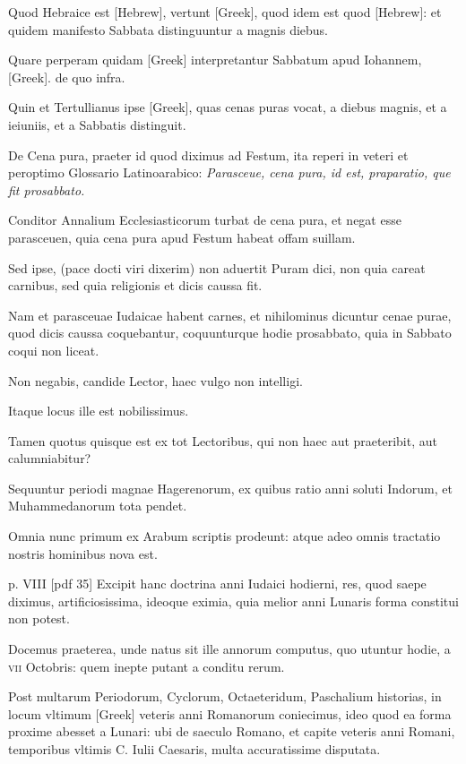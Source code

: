 \begin{parnumbers}
Quod Hebraice est \texthebrew{[Hebrew]}, vertunt \textgreek{[Greek]}, quod idem
est quod \texthebrew{[Hebrew]}: et quidem manifesto Sabbata distinguuntur a
magnis diebus. 

Quare perperam quidam \textgreek{[Greek]} interpretantur
Sabbatum apud Iohannem, \textgreek{[Greek]}. de quo infra.

Quin et Tertullianus ipse \textgreek{[Greek]},
quas cenas puras vocat, a diebus magnis, et a ieiuniis, et a
Sabbatis distinguit.

De Cena pura, praeter id quod diximus ad
Festum, ita reperi in veteri et peroptimo Glossario Latinoarabico:
\textit{Parasceue, cena pura, id est, praparatio, que fit prosabbato.}

Conditor Annalium Ecclesiasticorum turbat de cena
pura, et negat esse parasceuen, quia cena pura apud Festum
habeat offam suillam.

Sed ipse, (pace docti viri dixerim) non
aduertit Puram dici, non quia careat carnibus, sed quia religionis
et dicis caussa fit.

Nam et parasceuae Iudaicae habent carnes,
et nihilominus dicuntur cenae purae, quod dicis caussa coquebantur,
coquunturque hodie prosabbato, quia in Sabbato
coqui non liceat.

Non negabis, candide Lector, haec vulgo non intelligi.

Itaque locus ille est nobilissimus. 

Tamen quotus quisque est ex tot Lectoribus, qui non haec aut praeteribit,
aut calumniabitur?

Sequuntur periodi magnae Hagerenorum,
ex quibus ratio anni soluti Indorum, et Muhammedanorum
tota pendet.

Omnia nunc primum ex Arabum scriptis
prodeunt: atque adeo omnis tractatio nostris hominibus
nova est.

\clearpage
p. VIII [pdf 35]
Excipit hanc doctrina anni Iudaici hodierni, res, quod
saepe diximus, artificiosissima, ideoque eximia, quia melior
anni Lunaris forma constitui non potest.

Docemus praeterea, unde
natus sit ille annorum computus, quo utuntur hodie, a \textsc{vii} Octobris:
quem inepte putant a conditu rerum.

Post multarum Periodorum,
Cyclorum, Octaeteridum, Paschalium historias, in locum vltimum
\textgreek{[Greek]} veteris anni Romanorum coniecimus, ideo
quod ea forma proxime abesset a Lunari: ubi de saeculo Romano,
et capite veteris anni Romani, temporibus vltimis C. Iulii Caesaris,
multa accuratissime disputata.


\end{parnumbers}

